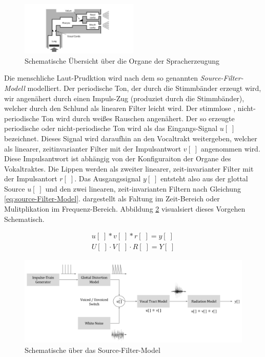 \begin{figure}[h]
	\centering
	\includegraphics[width=0.5\textwidth]{bilder/SchematicVocalOrgans.png}
	\caption{Schematische Übersicht über die Organe der Spracherzeugung \cite{speechProduction}}
	\label{img:schematicVocalOrgans}
\end{figure}	

Die menschliche Laut-Prudktion wird nach dem so genannten \emph{Source-Filter-Modell} modelliert. Der periodische Ton, der durch die Stimmbänder erzeugt wird, wir angenähert durch einen Impuls-Zug (produziet durch die Stimmbänder), welcher durch den Schlund als linearen Filter leicht wird. Der stimmlose , nicht-periodische Ton wird durch weißes Rauschen angenähert. Der so erzeugte periodische oder nicht-periodische Ton wird als das Eingangs-Signal $u[\;]$ bezeichnet. Dieses Signal wird daraufhin an den Vocaltrakt weitergeben, welcher als linearer, zeitinvarianter Filter mit der Impulsantwort $v[\;]$ angenommen wird. Diese Impulsantwort ist abhängig von der Konfiguraiton der Organe des Vokaltraktes. Die Lippen werden als zweiter linearer, zeit-invarianter Filter mit der Impulsantort $r[\;]$. Das Ausgangssignal $y[\;]$ entsteht also aus der glottal Source $u[\;]$ und den zwei linearen, zeit-invarianten Filtern nach Gleichung \ref{eq:source-Filter-Model}. dargestellt als Faltung im Zeit-Bereich oder Mulitplikation im Frequenz-Bereich.
Abbildung \ref{img:source-filter-model} visualsiert dieses Vorgehen Schematisch. \cite[S. 62 - 63]{cryModel} \cite{speechProduction}

\begin{equation}
\begin{gathered}
u[\;] * v[\;] * r[\;] = y[\;] \\
U[\;] \cdot V[\;] \cdot R[\;] = Y[\;] 
\end{gathered} 
\label{eq:source-Filter-Model}
\end{equation}

\begin{figure}[h]
	\centering
	\includegraphics[width=1\textwidth]{bilder/source-filter-model.png}
	\caption{Schematische über das Source-Filter-Model \cite[S. \glqq Source estimation\grqq, S. 17]{ricardo_ceps}}
	\label{img:source-filter-model}
\end{figure}	


